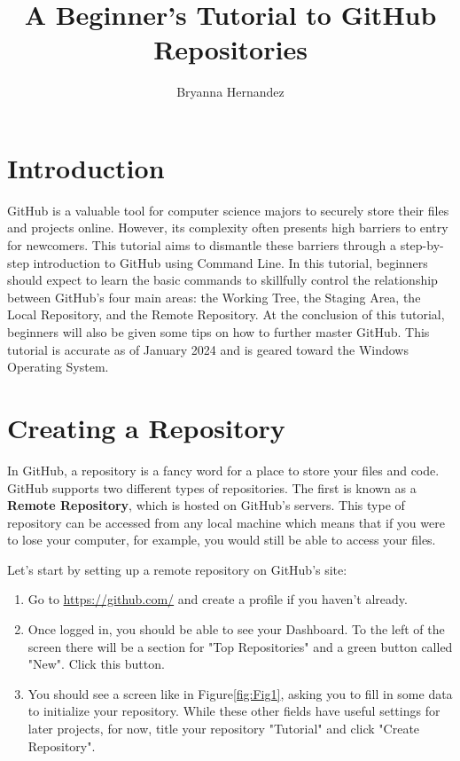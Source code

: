 \documentclass[10pt]{article}
\title{A Beginner's Tutorial to GitHub Repositories}
\author{Bryanna Hernandez}
\affiliation{Occidental College}
\begin{document}
\maketitle

\section{Introduction}

GitHub is a valuable tool for computer science majors to securely store their files and projects online. However, its complexity often presents high barriers to entry for newcomers. This tutorial aims to dismantle these barriers through a step-by-step introduction to GitHub using Command Line. In this tutorial, beginners should expect to learn the basic commands to skillfully control the relationship between GitHub's four main areas: the Working Tree, the Staging Area, the Local Repository, and the Remote Repository. At the conclusion of this tutorial, beginners will also be given some tips on how to further master GitHub. This tutorial is accurate as of January 2024 and is geared toward the Windows Operating System. 

\section{Creating a Repository}

In GitHub, a repository is a fancy word for a place to store your files and code. GitHub supports two different types of repositories. The first is known as a \textbf{Remote Repository}, which is hosted on GitHub's servers. This type of repository can be accessed from any local machine which means that if you were to lose your computer, for example, you would still be able to access your files. 

Let's start by setting up a remote repository on GitHub's site:

\begin{enumerate}
	\item Go to \url{https://github.com/} and create a profile if you haven't already.
	\item Once logged in, you should be able to see your Dashboard. To the left of the screen there will be a section for "Top Repositories" and a green button called "New". Click this button.
	\item You should see a screen like in Figure\ref{fig:Fig1}, asking you to fill in some data to initialize your repository. While these other fields have useful settings for later projects, for now, title your repository "Tutorial" and click "Create Repository".
\end{enumerate}
\end{document}
